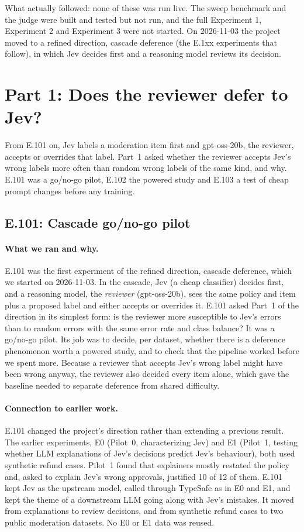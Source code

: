 \documentclass[11pt]{article}
\renewcommand{\_}{\origunderscore\allowbreak}
\begin{document}
What actually followed: none of these was run live. The sweep benchmark and the judge were built and tested but not run, and the full Experiment 1, Experiment 2 and Experiment 3 were not started. On 2026-11-03 the project moved to a refined direction, cascade deference (the E.1xx experiments that follow), in which Jev decides first and a reasoning model reviews its decision.

\section{Part 1: Does the reviewer defer to Jev?}\label{sec:part1}

From E.101 on, Jev labels a moderation item first and gpt-oss-20b, the reviewer, accepts or overrides that label. Part~1 asked whether the reviewer accepts Jev's wrong labels more often than random wrong labels of the same kind, and why. E.101 was a go/no-go pilot, E.102 the powered study and E.103 a test of cheap prompt changes before any training.

\subsection{E.101: Cascade go/no-go pilot}\label{sec:e101}

\paragraph{What we ran and why.}
E.101 was the first experiment of the refined direction, cascade deference, which we started on 2026-11-03. In the cascade, Jev (a cheap classifier) decides first, and a reasoning model, the \emph{reviewer} (gpt-oss-20b), sees the same policy and item plus a proposed label and either accepts or overrides it. E.101 asked Part~1 of the direction in its simplest form: is the reviewer more susceptible to Jev's errors than to random errors with the same error rate and class balance? It was a go/no-go pilot. Its job was to decide, per dataset, whether there is a deference phenomenon worth a powered study, and to check that the pipeline worked before we spent more. Because a reviewer that accepts Jev's wrong label might have been wrong anyway, the reviewer also decided every item alone, which gave the baseline needed to separate deference from shared difficulty.

\paragraph{Connection to earlier work.}
E.101 changed the project's direction rather than extending a previous result. The earlier experiments, E0 (Pilot~0, characterizing Jev) and E1 (Pilot~1, testing whether LLM explanations of Jev's decisions predict Jev's behaviour), both used synthetic refund cases. Pilot~1 found that explainers mostly restated the policy and, asked to explain Jev's wrong approvals, justified 10 of 12 of them. E.101 kept Jev as the upstream model, called through TypeSafe as in E0 and E1, and kept the theme of a downstream LLM going along with Jev's mistakes. It moved from explanations to review decisions, and from synthetic refund cases to two public moderation datasets. No E0 or E1 data was reused.
\end{document}
